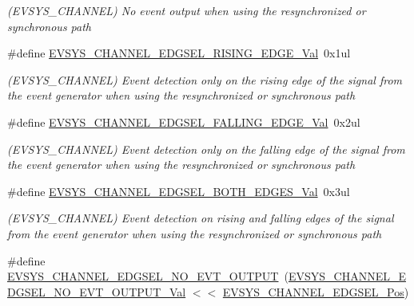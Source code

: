 \begin{DoxyCompactItemize}
\begin{DoxyCompactList}\small\item\em (E\+V\+S\+Y\+S\+\_\+\+C\+H\+A\+N\+N\+EL) No event output when using the resynchronized or synchronous path \end{DoxyCompactList}\item 
\#define \mbox{\hyperlink{group___s_a_m_d21___e_v_s_y_s_ga74f200244816d34ebcda294dfa39d163}{E\+V\+S\+Y\+S\+\_\+\+C\+H\+A\+N\+N\+E\+L\+\_\+\+E\+D\+G\+S\+E\+L\+\_\+\+R\+I\+S\+I\+N\+G\+\_\+\+E\+D\+G\+E\+\_\+\+Val}}~0x1ul
\begin{DoxyCompactList}\small\item\em (E\+V\+S\+Y\+S\+\_\+\+C\+H\+A\+N\+N\+EL) Event detection only on the rising edge of the signal from the event generator when using the resynchronized or synchronous path \end{DoxyCompactList}\item 
\#define \mbox{\hyperlink{group___s_a_m_d21___e_v_s_y_s_gaea62b90832a5f319570b4fd0cdb884d5}{E\+V\+S\+Y\+S\+\_\+\+C\+H\+A\+N\+N\+E\+L\+\_\+\+E\+D\+G\+S\+E\+L\+\_\+\+F\+A\+L\+L\+I\+N\+G\+\_\+\+E\+D\+G\+E\+\_\+\+Val}}~0x2ul
\begin{DoxyCompactList}\small\item\em (E\+V\+S\+Y\+S\+\_\+\+C\+H\+A\+N\+N\+EL) Event detection only on the falling edge of the signal from the event generator when using the resynchronized or synchronous path \end{DoxyCompactList}\item 
\#define \mbox{\hyperlink{group___s_a_m_d21___e_v_s_y_s_ga30ceae6c03e9e5fb6302f5f4d234599d}{E\+V\+S\+Y\+S\+\_\+\+C\+H\+A\+N\+N\+E\+L\+\_\+\+E\+D\+G\+S\+E\+L\+\_\+\+B\+O\+T\+H\+\_\+\+E\+D\+G\+E\+S\+\_\+\+Val}}~0x3ul
\begin{DoxyCompactList}\small\item\em (E\+V\+S\+Y\+S\+\_\+\+C\+H\+A\+N\+N\+EL) Event detection on rising and falling edges of the signal from the event generator when using the resynchronized or synchronous path \end{DoxyCompactList}\item 
\#define \mbox{\hyperlink{group___s_a_m_d21___e_v_s_y_s_ga700eb99d5080fdf2d9c8a3302bd33ffc}{E\+V\+S\+Y\+S\+\_\+\+C\+H\+A\+N\+N\+E\+L\+\_\+\+E\+D\+G\+S\+E\+L\+\_\+\+N\+O\+\_\+\+E\+V\+T\+\_\+\+O\+U\+T\+P\+UT}}~(\mbox{\hyperlink{group___s_a_m_d21___e_v_s_y_s_ga80b0403aa00907e545ba1ce27a55b03a}{E\+V\+S\+Y\+S\+\_\+\+C\+H\+A\+N\+N\+E\+L\+\_\+\+E\+D\+G\+S\+E\+L\+\_\+\+N\+O\+\_\+\+E\+V\+T\+\_\+\+O\+U\+T\+P\+U\+T\+\_\+\+Val}} $<$$<$ \mbox{\hyperlink{group___s_a_m_d21___e_v_s_y_s_ga940ccedfddf915a4532da9b752cab3a0}{E\+V\+S\+Y\+S\+\_\+\+C\+H\+A\+N\+N\+E\+L\+\_\+\+E\+D\+G\+S\+E\+L\+\_\+\+Pos}})
$$
\end{DoxyCompactItemize}
